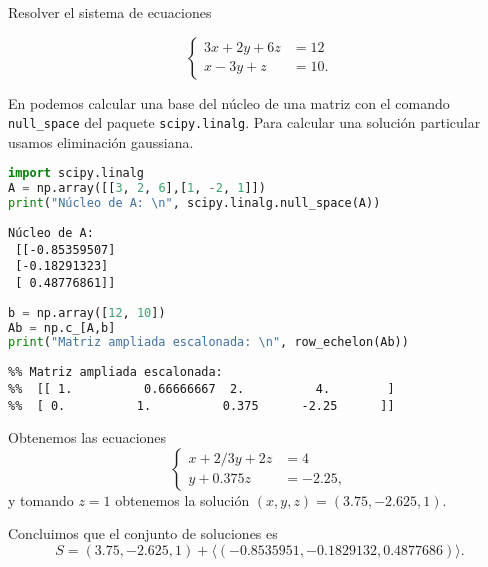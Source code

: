\begin{ejemplo} Resolver el sistema de ecuaciones

$$
\left\{
\begin{aligned}
3x + 2y + 6z &= 12 \\
x - 3y + z &= 10.
\end{aligned}
\right.
$$

En \python podemos calcular una base del núcleo de una matriz con el comando \texttt{null\_space} del paquete \texttt{scipy.linalg}. Para calcular una solución particular usamos eliminación gaussiana.

\begin{Shaded}
\begin{lstlisting}[language=Python]
import scipy.linalg
A = np.array([[3, 2, 6],[1, -2, 1]])
print("Núcleo de A: \n", scipy.linalg.null_space(A))
\end{lstlisting}
\end{Shaded}

\begin{verbatim}
Núcleo de A:
 [[-0.85359507]
 [-0.18291323]
 [ 0.48776861]]
\end{verbatim}

\begin{Shaded}
\begin{lstlisting}[language=Python]
b = np.array([12, 10])
Ab = np.c_[A,b]
print("Matriz ampliada escalonada: \n", row_echelon(Ab))
\end{lstlisting}
\end{Shaded}

\begin{verbatim}
%% Matriz ampliada escalonada:
%%  [[ 1.          0.66666667  2.          4.        ]
%%  [ 0.          1.          0.375      -2.25      ]]
\end{verbatim}

Obtenemos las ecuaciones
$$
\left\{
\begin{aligned}
x + 2/3y + 2z &= 4 \\
y + 0.375z &= -2.25,
\end{aligned}
\right.
$$
y tomando $z=1$ obtenemos la solución $(x,y,z) = (3.75, -2.625, 1)$.

Concluimos que el conjunto de soluciones es
$$
S = (3.75, -2.625, 1) + \langle (-0.8535951, -0.1829132,  0.4877686) \rangle.
$$
\end{ejemplo}

